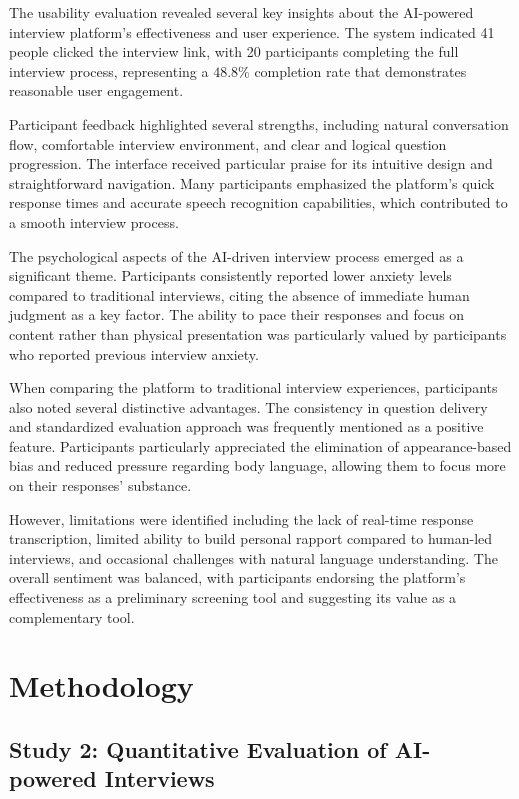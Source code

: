 \documentclass[sigchi,nonacm,manuscript]{acmart}
\begin{document}
The usability evaluation revealed several key insights about the AI-powered interview platform's effectiveness and user experience. The system indicated 41 people clicked the interview link, with 20 participants completing the full interview process, representing a $48.8\%$ completion rate that demonstrates reasonable user engagement.

Participant feedback highlighted several strengths, including natural conversation flow, comfortable interview environment, and clear and logical question progression. The interface received particular praise for its intuitive design and straightforward navigation. Many participants emphasized the platform's quick response times and accurate speech recognition capabilities, which contributed to a smooth interview process.

The psychological aspects of the AI-driven interview process emerged as a significant theme. Participants consistently reported lower anxiety levels compared to traditional interviews, citing the absence of immediate human judgment as a key factor. The ability to pace their responses and focus on content rather than physical presentation was particularly valued by participants who reported previous interview anxiety.

When comparing the platform to traditional interview experiences, participants also noted several distinctive advantages. The consistency in question delivery and standardized evaluation approach was frequently mentioned as a positive feature. Participants particularly appreciated the elimination of appearance-based bias and reduced pressure regarding body language, allowing them to focus more on their responses' substance.

However, limitations were identified including the lack of real-time response transcription, limited ability to build personal rapport compared to human-led interviews, and occasional challenges with natural language understanding. The overall sentiment was balanced, with participants endorsing the platform's effectiveness as a preliminary screening tool and suggesting its value as a complementary tool.
\section{Methodology}


\subsection{Study 2: Quantitative Evaluation of AI-powered Interviews}
\end{document}
